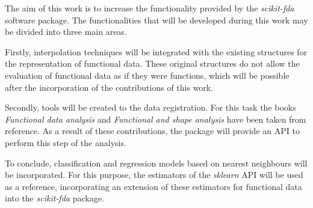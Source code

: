 The aim of this work is to increase the functionality provided by the
\textit{scikit-fda} software package. The functionalities that will
be developed during this work may be divided into three main areas.

Firstly, interpolation techniques will be integrated with the existing
structures for the representation of functional data. These original structures
do not allow the evaluation of functional data as if they were functions,
which will be possible after the incorporation of the contributions of this work.

Secondly, tools will be created to the data registration. For this task
the books \textit{Functional data analysis}\cite{Ramsay2005} and
\textit{Functional and shape analysis}\cite{Srivastava2016} have been taken from
reference. As a result of these contributions, the package will provide an API
to perform this step of the analysis.

To conclude, classification and regression models based on nearest neighbours
will be incorporated. For this purpose,
the estimators of the \textit{sklearn}\cite{sklearn} API will be used as a reference,
incorporating an extension of these estimators for functional data
into the \textit{scikit-fda} package.
